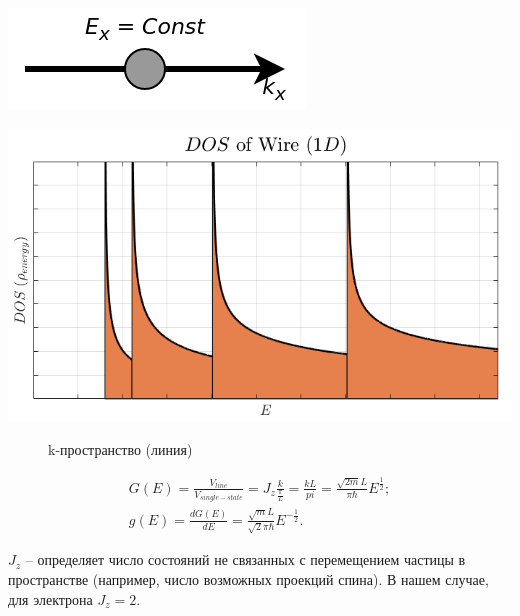 \noindent
\begin{minipage}[b]{0.3\textwidth}
	\centering
    \includegraphics[width=\textwidth]{assets/1Ddot}
\end{minipage}
\hfill
\begin{minipage}[b]{0.6\textwidth}
	\centering
	\includegraphics[width=\textwidth]{assets/gE1D}
\end{minipage}

\begin{figure}[h]
	\centering
	\caption{k-пространство (линия)}
	\label{fig:1Ddot}
\end{figure}

\begin{gather*} 
	G(E) = \frac{V_{line}}{V_{single-state}} = J_{z}\frac{k}{\frac{\pi}{L}} = \frac{kL}{pi} = \frac{\sqrt{2m}L}{\pi\hbar}E^{\frac{1}{2}};\\
	g(E) = \frac{dG(E)}{dE} = \frac{\sqrt{m}L}{\sqrt{2}\pi\hbar}E^{-\frac{1}{2}}.
\end{gather*}

$J_{z}$ -- определяет число состояний не связанных с перемещением частицы в пространстве (например, число возможных проекций спина). В нашем случае, для электрона $J_{z}=2$.